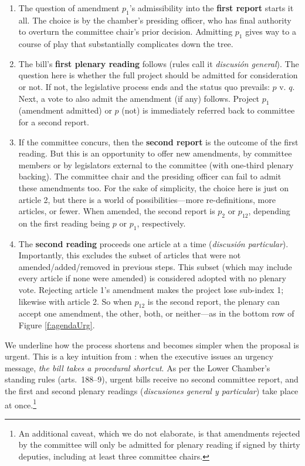 \documentclass[letter,12pt]{article}
\begin{document}
\begin{enumerate}
\item The question of amendment $p_1$'s admissibility into the \textbf{first report} starts it all. The choice is by the chamber's presiding officer, who has final authority to overturn the committee chair's prior decision. Admitting $p_1$ gives way to a course of play that substantially complicates down the tree. 
\item The bill's \textbf{first plenary reading} follows (rules call it \emph{discusión general}). The question here is whether the full project should be admitted for consideration or not. If not, the legislative process ends and the status quo prevails: $p$ v. $q$. Next, a vote to also admit the amendment (if any) follows. Project $p_1$ (amendment admitted) or $p$ (not) is immediately referred back to committee for a second report. 
\item If the committee concurs, then the \textbf{second report} is the outcome of the first reading. But this is an opportunity to offer new amendments, by committee members or by legislators external to the committee (with one-third plenary backing). The committee chair and the presiding officer can fail to admit these amendments too. For the sake of simplicity, the choice here is just on article 2, but there is a world of possibilities---more re-definitions, more articles, or fewer. When amended, the second report is $p_2$ or $p_{12}$, depending on the first reading being $p$ or $p_1$, respectively. 
\item The \textbf{second reading} proceeds one article at a time (\emph{discusión particular}). Importantly, this excludes the subset of articles that were not amended/added/removed in previous steps. This subset (which may include every article if none were amended) is considered adopted with no plenary vote. Rejecting article 1's amendment makes the project lose sub-index 1; likewise with article 2. So when $p_{12}$ is the second report, the plenary can accept one amendment, the other, both, or neither---as in the bottom row of Figure \ref{f:agendaUrg}. 
\end{enumerate}

We underline how the process shortens and becomes simpler when the proposal is urgent. This is a key intuition from \citet{sotoCongChile2015}: when the executive issues an urgency message, \emph{the bill takes a procedural shortcut}. As per the Lower Chamber's standing rules (arts.~188--9), urgent bills receive no second committee report, and the first and second plenary readings (\emph{discusiones general y particular}) take place at once.\footnote{An additional caveat, which we do not elaborate, is that amendments rejected by the committee will only be admitted for plenary reading if signed by thirty deputies, including at least three committee chairs.} 
\end{document}
